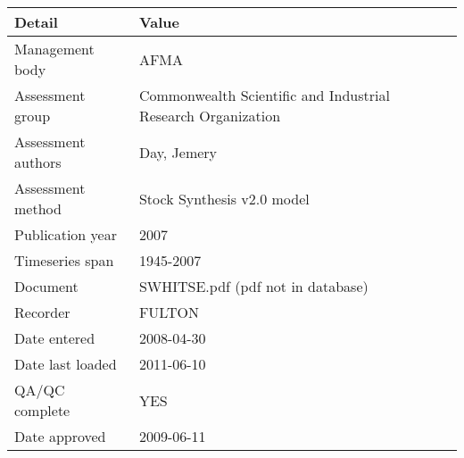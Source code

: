 \begin{table}[htb]
\centering
\begin{tabular}{lp{7cm}}
\toprule
Detail & Value \\
\midrule
Management body    & AFMA                                                         \\
Assessment group   & Commonwealth Scientific and Industrial Research Organization \\
Assessment authors & Day, Jemery                                                  \\
Assessment method  & Stock Synthesis v2.0 model                                   \\
Publication year   & 2007                                                         \\
Timeseries span    & 1945-2007                                                    \\
Document           & SWHITSE.pdf (pdf not in database)                            \\
Recorder           & FULTON                                                       \\
Date entered       & 2008-04-30                                                   \\
Date last loaded   & 2011-06-10                                                   \\
QA/QC complete     & YES                                                          \\
Date approved      & 2009-06-11                                                   \\
\bottomrule
\end{tabular}
\label{tab:assessdet}
\end{table}
